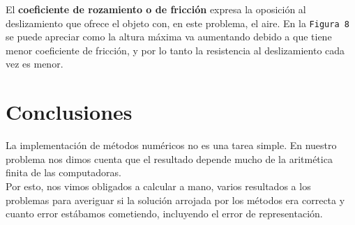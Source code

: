 \documentclass[a4paper]{article}
\begin{document}
El \textbf{coeficiente de rozamiento o de fricción} expresa la oposición al deslizamiento que ofrece el objeto con, en este problema, el aire. En la \texttt{Figura 8} se puede apreciar como la altura máxima va aumentando debido a que tiene menor coeficiente de fricción, y por lo tanto la resistencia al deslizamiento cada vez es menor.



\newpage


\newpage

\section{Conclusiones}
La implementación de métodos numéricos no es una tarea simple. En nuestro problema nos dimos cuenta que el resultado depende mucho de la aritmética finita de las computadoras. \\ \hspace{1em}
Por esto, nos vimos obligados a calcular a mano, varios resultados a los problemas para averiguar si la solución arrojada por los métodos era correcta y cuanto error estábamos cometiendo, incluyendo el error de representación.  \\ \vspace{1em}
\end{document}
